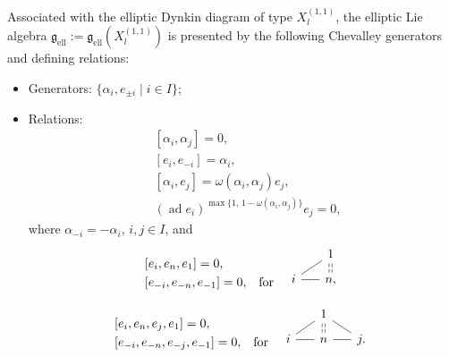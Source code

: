 \documentclass[12pt,reqno]{amsart}
\numberwithin{equation}{section}
\begin{document}
	
	Associated with the elliptic Dynkin diagram of type $X_l^{(1,1)}$, the elliptic Lie algebra
	$\mathfrak{g}_{\mathrm{ell}}:=\mathfrak{g}_{\mathrm{ell}}(X_l^{(1,1)})$
	is presented by the following Chevalley generators and defining relations:
	\begin{itemize}
		\item[] Generators: $\{\alpha_i,e_{\pm i}\mid i\in I\}$;
		\item[] Relations:
		\begin{align}
			&[\alpha_i,\alpha_j]=0   \label{eq:rel-ell-1},  \\
			&[e_i,e_{-i}]=\alpha_i  \label{eq:rel-ell-2},    \\
			&[\alpha_i,e_j]= \omega(\alpha_i,\alpha_j)e_j  \label{eq:rel-ell-3},\\
			&(\operatorname{ad} e_i)^{\max\{1,\,1-\omega(\alpha_i,\alpha_j)\}}e_j=0,
			\label{eq:rel-ell-4}
		\end{align}
		where $\alpha_{-i}=-\alpha_i$, $i,j\in I$, and
		\begin{equation}
			\begin{aligned}[b]
				&[e_i,e_n,e_{1}]=0, \\
				&[e_{-i},e_{-n},e_{-1}]=0,
			\end{aligned}
			\quad \text{for} \quad
			\begin{tikzcd}[
				baseline={([yshift=0.3em]current bounding box.south)}, 
				row sep={2em, between origins}, 
				column sep=1.5em, 
				ampersand replacement=\&
				]
				\& 1 \\
				i \arrow[ur, no head] \arrow[r, no head] \& n, \arrow[u, dashed, shift left=0.5, no head] \arrow[u, dashed, shift right=0.5, no head]
			\end{tikzcd}
			\label{eq:rel-ell-5}
		\end{equation}
		
		\begin{equation}
			\begin{aligned}[b]
				&[e_i,e_n,e_j,e_{1}]=0, \\
				&[e_{-i},e_{-n},e_{-j},e_{-1}]=0,
			\end{aligned}
			\quad \text{for} \quad
			\begin{tikzcd}[
				baseline={([yshift=0.3em]current bounding box.south)}, 
				row sep={2em, between origins}, 
				column sep=1.5em, 
				ampersand replacement=\&
				]
				\& 1 \& \\
				i \arrow[ur, no head] \arrow[r, no head] \& n \arrow[u, dashed, shift left=0.5, no head] \arrow[u, dashed, shift right=0.5, no head] \arrow[r, no head] \& j. \arrow[ul, no head]
			\end{tikzcd}
			\label{eq:rel-ell-6}
		\end{equation}
		

\end{itemize}
\end{document}
